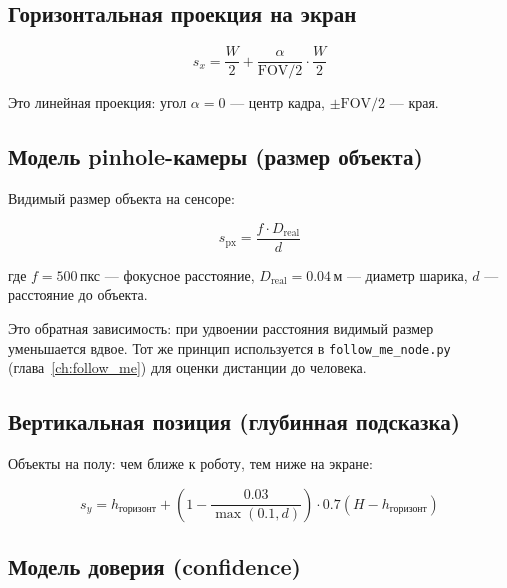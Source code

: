 \subsection{Горизонтальная проекция на экран}

\begin{equation}
  \boxed{s_x = \frac{W}{2} + \frac{\alpha}{\text{FOV}/2} \cdot \frac{W}{2}}
  \label{eq:screen_x}
\end{equation}

Это линейная проекция: угол $\alpha = 0$ --- центр кадра, $\pm \text{FOV}/2$ --- края.

\subsection{Модель pinhole-камеры (размер объекта)}

Видимый размер объекта на сенсоре:

\begin{equation}
  \boxed{s_{\text{px}} = \frac{f \cdot D_{\text{real}}}{d}}
  \label{eq:pinhole}
\end{equation}

где $f = 500\,\text{пкс}$ --- фокусное расстояние, $D_{\text{real}} = 0.04\,\text{м}$ ---
диаметр шарика, $d$ --- расстояние до объекта.

\begin{notebox}
Это обратная зависимость: при удвоении расстояния видимый размер уменьшается вдвое.
Тот же принцип используется в \texttt{follow\_me\_node.py}
(глава~\ref{ch:follow_me}) для оценки дистанции до человека.
\end{notebox}

\subsection{Вертикальная позиция (глубинная подсказка)}

Объекты на полу: чем ближе к роботу, тем ниже на экране:

\begin{equation}
  s_y = h_{\text{горизонт}} + \left(1 - \frac{0.03}{\max(0.1, d)}\right) \cdot 0.7(H - h_{\text{горизонт}})
  \label{eq:screen_y}
\end{equation}

\subsection{Модель доверия (confidence)}

